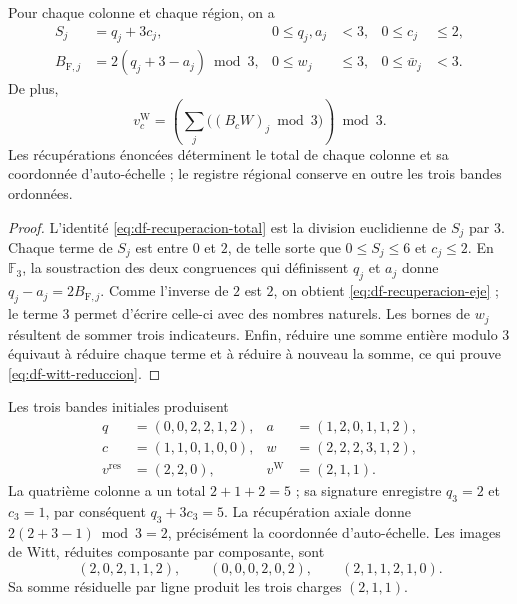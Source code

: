 \begin{theorem}
\label{thm:df-recuperacion-firma}
Pour chaque colonne et chaque région, on a
\begin{align}
 S_j&=q_j+3c_j,&0\leq q_j,a_j&<3,&0\leq c_j&\leq2,
 \label{eq:df-recuperacion-total}\\
 B_{\mathrm F,j}&=2(q_j+3-a_j)\bmod3,&0\leq w_j&\leq3,
 &0\leq\bar w_j&<3.
 \label{eq:df-recuperacion-eje}
\end{align}
De plus,
\begin{equation}
 v_c^{\mathrm W}
 =\left(\sum_j\bigl((B_cW)_j\bmod3\bigr)\right)\bmod3.
 \label{eq:df-witt-reduccion}
\end{equation}
Les récupérations énoncées déterminent le total de chaque colonne et sa
coordonnée d'auto-échelle ; le registre régional conserve en outre
les trois bandes ordonnées.
\end{theorem}

\begin{proof}
L'identité \eqref{eq:df-recuperacion-total} est la division euclidienne de
\(S_j\) par \(3\). Chaque terme de \(S_j\) est entre \(0\) et \(2\),
de telle sorte que \(0\leq S_j\leq6\) et \(c_j\leq2\). En \(\mathbb F_3\),
la soustraction des deux congruences qui définissent \(q_j\) et \(a_j\) donne
\(q_j-a_j=2B_{\mathrm F,j}\). Comme l'inverse de \(2\) est \(2\), on
obtient \eqref{eq:df-recuperacion-eje} ; le terme \(3\) permet
d'écrire celle-ci avec des nombres naturels. Les bornes de \(w_j\) résultent de sommer trois
indicateurs. Enfin, réduire une somme entière modulo \(3\) équivaut
à réduire chaque terme et à réduire à nouveau la somme, ce qui prouve
\eqref{eq:df-witt-reduccion}.
\end{proof}

\begin{example}
Les trois bandes initiales produisent
\begin{align*}
 q&=(0,0,2,2,1,2),&a&=(1,2,0,1,1,2),\\
 c&=(1,1,0,1,0,0),&w&=(2,2,2,3,1,2),\\
 v^{\mathrm{res}}&=(2,2,0),&v^{\mathrm W}&=(2,1,1).
\end{align*}
La quatrième colonne a un total \(2+1+2=5\) ; sa signature enregistre \(q_3=2\) et \(c_3=1\), par conséquent \(q_3+3c_3=5\).
La récupération axiale donne \(2(2+3-1)\bmod3=2\), précisément la coordonnée d'auto-échelle.
Les images de Witt, réduites composante par composante, sont
\[
 (2,0,2,1,1,2),\qquad
 (0,0,0,2,0,2),\qquad
 (2,1,1,2,1,0).
\]
Sa somme résiduelle par ligne produit les trois charges \((2,1,1)\).
\end{example}

